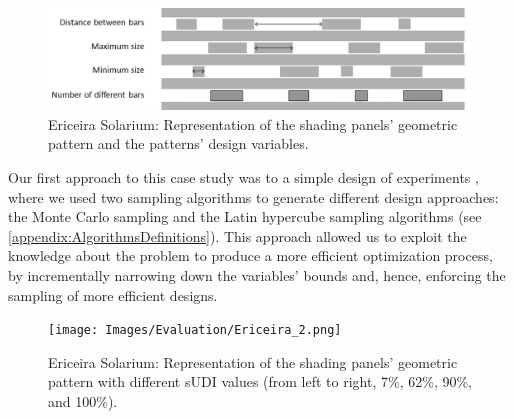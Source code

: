 \begin{figure}[htbp]
	\centering
	\includegraphics[width=\textwidth]{Images/Evaluation/Ericeira_1.jpg}
	\caption{Ericeira Solarium: Representation of the shading panels' geometric pattern and the patterns' design variables.}
	\label{fig:ericeira_panels_explanation}
\end{figure}

Our first approach to this case study was to a simple design of experiments \cite{Caetano2018}, where we used two sampling algorithms to generate different design approaches: the Monte Carlo sampling and the Latin hypercube sampling algorithms (see \cref{appendix:AlgorithmsDefinitions}). This approach allowed us to exploit the knowledge about the problem to produce a more efficient optimization process, by incrementally narrowing down the variables' bounds and, hence, enforcing the sampling of more efficient designs. %


\begin{figure}
	\centering
	\texttt{[image: Images/Evaluation/Ericeira\_2.png]}
	\caption{Ericeira Solarium: Representation of the shading panels’ geometric pattern with different sUDI values (from left to right, 7\%, 62\%, 90\%, and 100\%).}
	\label{fig:ericeira_multiple_panels}
\end{figure}

